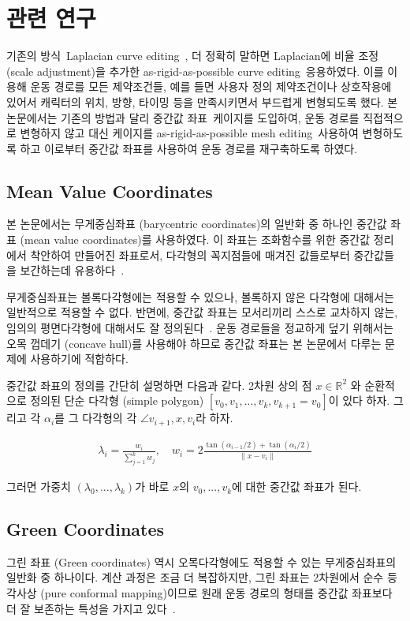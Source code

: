 \documentclass[11pt,a4paper,oneside,draft]{report}
\newcommand{\Kim}{\cite{Kim:2009:SMM:1531326.1531385}}
\newcommand{\Igarashi}{\cite{Igarashi:2005:ASM:1073204.1073323}}
\newcommand{\Floater}{\cite{Floater200319}}
\newcommand{\Hormann}{\cite{Hormann:2006:MVC:1183287.1183295}}
\newcommand{\Lipman}{\cite{Lipman:2008:GC:1360612.1360677}}
\newcommand{\Sorkine}{\cite{Sorkine:2004:LSE:1057432.1057456}}
\providecommand{\norm}[1]{\lVert#1\rVert}
\begin{document}
\chapter{관련 연구}

기존의 방식~ Laplacian curve editing~\Sorkine, 더 정확히 말하면
Laplacian에 비율 조정 (scale adjustment)을 추가한 as-rigid-as-possible curve
editing~ 응용하였다. 이를 이용해 운동 경로를 모든 제약조건들, 예를
들면 사용자 정의 제약조건이나 상호작용에 있어서 캐릭터의 위치, 방향, 타이밍
등을 만족시키면서 부드럽게 변형되도록 했다.  본 논문에서는 기존의 방법과 달리
중간값 좌표~ 케이지를 도입하여, 운동 경로를 직접적으로 변형하지 않고
대신 케이지를 as-rigid-as-possible mesh editing~ 사용하여 변형하도록
하고 이로부터 중간값 좌표를 사용하여 운동 경로를 재구축하도록 하였다.

\section{Mean Value Coordinates} 본 논문에서는 무게중심좌표
(barycentric coordinates)의 일반화 중 하나인 중간값 좌표 (mean value
coordinates)를 사용하였다. 이 좌표는 조화함수를 위한 중간값 정리에서 착안하여
만들어진 좌표로서, 다각형의 꼭지점들에 매겨진 값들로부터 중간값들을 보간하는데
유용하다~\Floater.

무게중심좌표는 볼록다각형에는 적용할 수 있으나, 볼록하지 않은 다각형에 대해서는
일반적으로 적용할 수 없다.  반면에, 중간값 좌표는 모서리끼리 스스로 교차하지
않는, 임의의 평면다각형에 대해서도 잘 정의된다~\Hormann. 운동 경로들을 정교하게
덮기 위해서는 오목 껍데기 (concave hull)를 사용해야 하므로 중간값 좌표는 본
논문에서 다루는 문제에 사용하기에 적합하다.

중간값 좌표의 정의를 간단히 설명하면 다음과 같다. 2차원 상의 점 $x \in
\mathbb{R}^2$ 와 순환적으로 정의된 단순 다각형 (simple polygon) $[v_0, v_1,
..., v_k, v_{k+1} = v_0]$이 있다 하자. 그리고 각 $\alpha_i$를 그 다각형의 각
$\angle v_{i+1},x,v_{i}$라 하자.

\begin{align}
\lambda_i = \frac{w_i}{\sum_{j=1}^{k}w_j}, \quad w_i =
2\frac{\tan(\alpha_{i-1}/2) + \tan(\alpha_{i}/2)}{\norm{x - v_i}}
\end{align}

그러면 가중치 $(\lambda_0, ..., \lambda_k)$가 바로 $x$의 $v_0, ...  , v_k$에
대한 중간값 좌표가 된다.

\section{Green Coordinates}
그린 좌표 (Green coordinates) 역시 오목다각형에도 적용할 수 있는
무게중심좌표의 일반화 중 하나이다. 계산 과정은 조금 더 복잡하지만, 그린 좌표는
2차원에서 순수 등각사상 (pure conformal mapping)이므로 원래 운동 경로의 형태를
중간값 좌표보다 더 잘 보존하는 특성을 가지고 있다~\Lipman.
\end{document}
